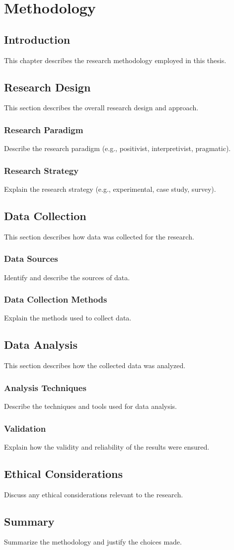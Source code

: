 \chapter{Methodology}
\label{ch:methodology}

\section{Introduction}
This chapter describes the research methodology employed in this thesis.

\section{Research Design}
This section describes the overall research design and approach.

\subsection{Research Paradigm}
Describe the research paradigm (e.g., positivist, interpretivist, pragmatic).

\subsection{Research Strategy}
Explain the research strategy (e.g., experimental, case study, survey).

\section{Data Collection}
This section describes how data was collected for the research.

\subsection{Data Sources}
Identify and describe the sources of data.

\subsection{Data Collection Methods}
Explain the methods used to collect data.

\section{Data Analysis}
This section describes how the collected data was analyzed.

\subsection{Analysis Techniques}
Describe the techniques and tools used for data analysis.

\subsection{Validation}
Explain how the validity and reliability of the results were ensured.

\section{Ethical Considerations}
Discuss any ethical considerations relevant to the research.

\section{Summary}
Summarize the methodology and justify the choices made.
